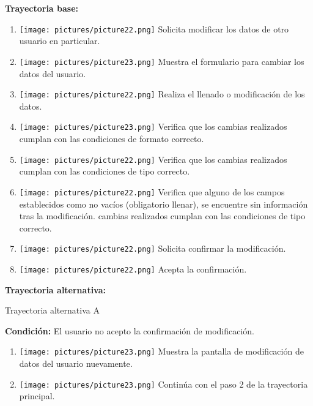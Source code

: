 \textbf{Trayectoria base:}        \begin{enumerate}
\item \texttt{[image: pictures/picture22.png]} Solicita modificar los datos de otro usuario en particular.
\item \texttt{[image: pictures/picture23.png]} Muestra el formulario para cambiar los datos del usuario.
\item \texttt{[image: pictures/picture22.png]} Realiza el llenado o modificación de los datos.
\item \texttt{[image: pictures/picture23.png]} Verifica que los cambias realizados cumplan con las condiciones de formato correcto.
\item \texttt{[image: pictures/picture22.png]} Verifica que los cambias realizados cumplan con las condiciones de tipo correcto.
\item \texttt{[image: pictures/picture22.png]} Verifica que alguno de los campos establecidos como no vacíos (obligatorio llenar), se encuentre sin información tras la modificación.
cambias realizados cumplan con las condiciones de tipo correcto.
\item \texttt{[image: pictures/picture22.png]} Solicita confirmar la modificación.
\item \texttt{[image: pictures/picture22.png]} Acepta la confirmación.
\end{enumerate}
\textbf{Trayectoria alternativa:} 
{\large Trayectoria alternativa A \par}
\vspace{0.3em}
\textbf{Condición:} El usuario no acepto la confirmación de modificación.
\begin{enumerate}
\item \texttt{[image: pictures/picture23.png]} Muestra la pantalla de modificación de datos del usuario nuevamente.
\item \texttt{[image: pictures/picture23.png]} Continúa con el paso 2 de la trayectoria principal.
\end{enumerate}

